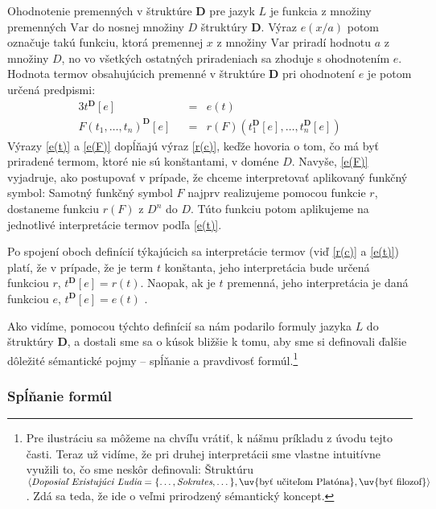 \documentclass[12pt, letterpaper]{article}
\begin{document}
Ohodnotenie premenných v štruktúre \textbf{D} pre jazyk $L$ je funkcia z množiny premenných $\text{Var}$ do nosnej množiny $D$ štruktúry \textbf{D}. Výraz $e(x/a)$ potom označuje takú funkciu, ktorá premennej $x$ z množiny $\text{Var}$ priradí hodnotu $a$ z množiny $D$, no vo všetkých ostatných priradeniach sa zhoduje s ohodnotením $e$. Hodnota termov obsahujúcich premenné v štruktúre \textbf{D} pri ohodnotení $e$ je potom určená predpismi:
	\begin{alignat}{3}
		t^\mathbf{D}[e] &&=& e(t) \label{e(t)} \\
		F(t_1, \dots, t_n)^\mathbf{D}[e] &&=& r(F)(t_{1}^{\mathbf{D}}[e], \dots, t_{n}^{\mathbf{D}}[e]) \label{e(F)}
	\end{alignat}
Výrazy \ref{e(t)} a \ref{e(F)} dopĺňajú výraz \ref{r(c)}, keďže hovoria o tom, čo má byť priradené termom, ktoré nie sú konštantami, v doméne $D$. Navyše, \ref{e(F)} vyjadruje, ako postupovať v prípade, že chceme interpretovať aplikovaný funkčný symbol: Samotný funkčný symbol $F$ najprv realizujeme pomocou funkcie $r$, dostaneme funkciu $r(F)$ z $D^n$ do $D$. Túto funkciu potom aplikujeme na jednotlivé interpretácie termov podľa \ref{e(t)}.\par
Po spojení oboch definícií týkajúcich sa interpretácie termov (viď \ref{r(c)} a \ref{e(t)}) platí, že v prípade, že je term $t$ konštanta, jeho interpretácia bude určená funkciou $r$, $t^\mathbf{D}[e] = r(t)$. Naopak, ak je $t$ premenná, jeho interpretácia je daná funkciou $e$, $t^\mathbf{D}[e] = e(t)$ \parencites[303]{peregrin_filosofie_2017}[44]{raclavsky_uvod_2015}{shapiro_classical_2022}[142]{svejdar_logika_2002}.\par 
Ako vidíme, pomocou týchto definícií sa nám podarilo  formuly jazyka $L$ do štruktúry \textbf{D}, a dostali sme sa o kúsok bližšie k tomu, aby sme si definovali ďalšie dôležité sémantické pojmy -- spĺňanie a pravdivosť formúl.\footnote{Pre ilustráciu sa môžeme na chvíľu vrátiť, k nášmu príkladu z úvodu tejto časti. Teraz už vidíme, že pri druhej interpretácii sme vlastne intuitívne využili to, čo sme neskôr definovali: Štruktúru $\langle \textit{Doposiaľ Existujúci Ľudia} = \{\dots, \textit{Sokrates}, \dots \}, \text{\uv{byť učiteľom Platóna}}, \text{\uv{byť filozof}}\rangle$. Zdá sa teda, že ide o veľmi prirodzený sémantický koncept.}


\subsubsection{Spĺňanie formúl}
\end{document}

